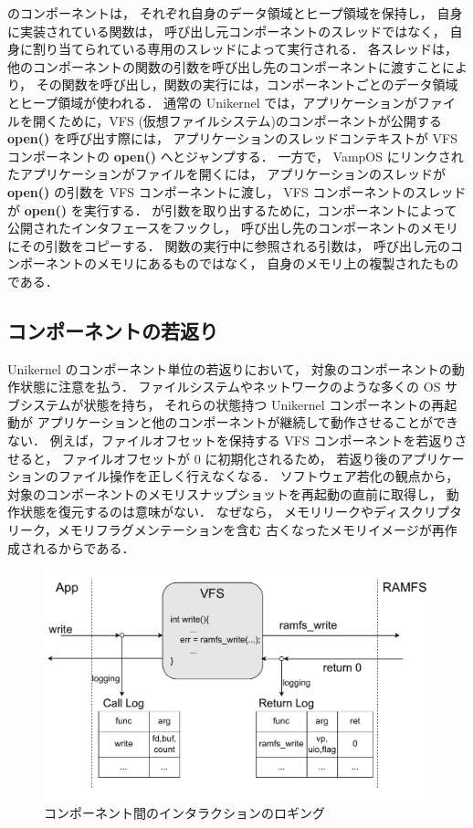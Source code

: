 \sysname のコンポーネントは，
それぞれ自身のデータ領域とヒープ領域を保持し，
自身に実装されている関数は，
呼び出し元コンポーネントのスレッドではなく，
自身に割り当てられている専用のスレッドによって実行される．
各スレッドは，
他のコンポーネントの関数の引数を呼び出し先のコンポーネントに渡すことにより，
その関数を呼び出し，関数の実行には，コンポーネントごとのデータ領域とヒープ領域が使われる．
通常の Unikernel では，アプリケーションがファイルを開くために，VFS (仮想ファイルシステム)のコンポーネントが公開する \textbf{open()} を呼び出す際には，
アプリケーションのスレッドコンテキストが VFS コンポーネントの \textbf{open()} へとジャンプする．
一方で， VampOS にリンクされたアプリケーションがファイルを開くには，
アプリケーションのスレッドが \textbf{open()} の引数を VFS コンポーネントに渡し，
VFS コンポーネントのスレッドが \textbf{open()} を実行する．
\sysname が引数を取り出するために，コンポーネントによって公開されたインタフェースをフックし，
呼び出し先のコンポーネントのメモリにその引数をコピーする．
関数の実行中に参照される引数は，
呼び出し元のコンポーネントのメモリにあるものではなく，
自身のメモリ上の複製されたものである．


\subsection{コンポーネントの若返り}

Unikernel のコンポーネント単位の若返りにおいて，
対象のコンポーネントの動作状態に注意を払う．
ファイルシステムやネットワークのような多くの OS サブシステムが状態を持ち，
それらの状態持つ Unikernel コンポーネントの再起動が
アプリケーションと他のコンポーネントが継続して動作させることができない．
例えば，ファイルオフセットを保持する VFS コンポーネントを若返りさせると，
ファイルオフセットが 0 に初期化されるため，
若返り後のアプリケーションのファイル操作を正しく行えなくなる．
ソフトウェア若化の観点から，
対象のコンポーネントのメモリスナップショットを再起動の直前に取得し，
動作状態を復元するのは意味がない．
なぜなら，
メモリリークやディスクリプタリーク，メモリフラグメンテーションを含む
古くなったメモリイメージが再作成されるからである．

\begin{figure}[t]
    \centering
    \includegraphics[width=\linewidth]{img/logging.pdf}
    \vspace{-5mm}
    \caption{コンポーネント間のインタラクションのロギング}
    \label{fig:logging}
\end{figure}

